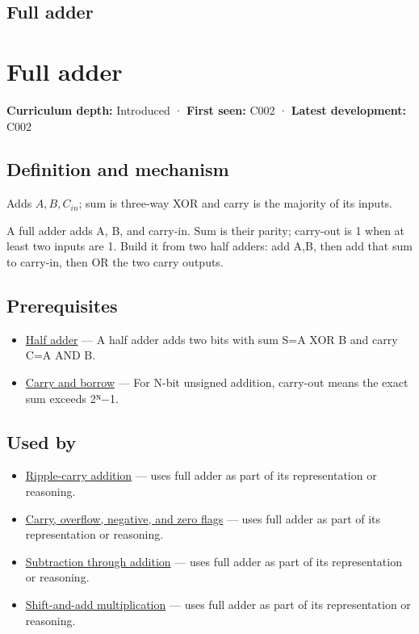 \hypertarget{appendix-d1a5b1e520c2}{}
\section*{Full adder}
\chapter{Full adder}\label{appendix-d1a5b1e520c2-full-adder}

\textbf{Curriculum depth:} Introduced · \textbf{First seen:} C002 · \textbf{Latest development:} C002

\section{Definition and mechanism}\label{appendix-d1a5b1e520c2-definition-and-mechanism}

Adds \(A,B,C_{in}\); sum is three-way XOR and carry is the majority of its inputs.

A full adder adds A, B, and carry-in. Sum is their parity; carry-out is 1 when at least two inputs are 1. Build it from two half adders: add A,B, then add that sum to carry-in, then OR the two carry outputs.

\section{Prerequisites}\label{appendix-d1a5b1e520c2-prerequisites}

\begin{itemize}
\tightlist
\item
  \hyperref[appendix-1652d27a8e90]{Half adder} --- A half adder adds two bits with sum S=A XOR B and carry C=A AND B.
\item
  \hyperref[appendix-d52d5f78ffd1]{Carry and borrow} --- For N-bit unsigned addition, carry-out means the exact sum exceeds 2ᴺ−1.
\end{itemize}

\section{Used by}\label{appendix-d1a5b1e520c2-used-by}

\begin{itemize}
\tightlist
\item
  \hyperref[appendix-17917d9fdbe3]{Ripple-carry addition} --- uses full adder as part of its representation or reasoning.
\item
  \hyperref[appendix-8d687c9c08ab]{Carry, overflow, negative, and zero flags} --- uses full adder as part of its representation or reasoning.
\item
  \hyperref[appendix-1c7df340573e]{Subtraction through addition} --- uses full adder as part of its representation or reasoning.
\item
  \hyperref[appendix-a65290d66ed9]{Shift-and-add multiplication} --- uses full adder as part of its representation or reasoning.
\end{itemize}

